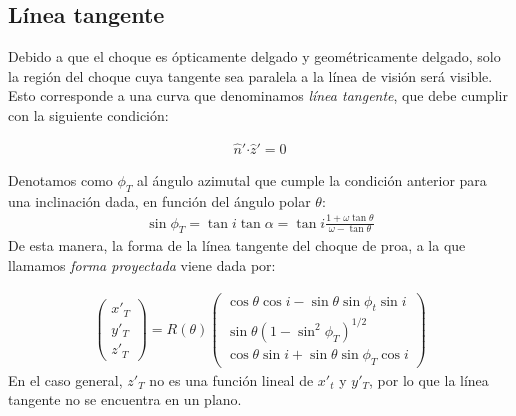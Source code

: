 \subsection{Línea tangente}

Debido a que el choque es \'opticamente delgado y geom\'etricamente
delgado, solo la regi\'on del choque cuya tangente sea paralela a la
l\'inea de visi\'on ser\'a visible. Esto corresponde a una curva que
denominamos \textit{l\'inea tangente}, que debe cumplir con la siguiente
condición:

\begin{align}
  \hat{n}'\boldsymbol{\cdot} \hat{z}' = 0
\end{align}

Denotamos como $\phi_T$ al ángulo azimutal que cumple la condición anterior
para una inclinación dada, en función del ángulo polar $\theta$:
\begin{align}
  \sin\phi_T = \tan i\tan\alpha = \tan i\frac{1+\omega\tan\theta}{\omega-\tan\theta}
  \label{eq:phi-tan}
\end{align}
De esta manera, la forma de la línea tangente del choque de proa, a la que llamamos
\textit{forma proyectada} viene dada por:

\begin{align}
  \left(
  \begin{array}{c}
    x'_T \\
    y'_T \\
    z'_T
  \end{array}
  \right) =
  R(\theta)\left(
  \begin{array}{c}
    \cos\theta\cos i - \sin\theta\sin\phi_t\sin i \\
    \sin\theta\left(1-\sin^2\phi_T\right)^{1/2} \\
    \cos\theta\sin i + \sin\theta\sin\phi_T\cos i
  \end{array}
  \right) \label{eq:proj-shape}
\end{align}
En el caso general, $z'_T$ no es una función lineal de $x'_t$ y $y'_T$, por lo que
la línea tangente no se encuentra en un plano.

